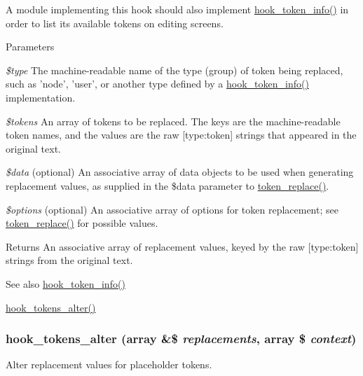A module implementing this hook should also implement \hyperlink{group__hooks_gab868597197cf36911f95dcd29ae0b954}{hook\_\-token\_\-info()} in order to list its available tokens on editing screens.


\begin{DoxyParams}{Parameters}
\item[{\em \$type}]The machine-\/readable name of the type (group) of token being replaced, such as 'node', 'user', or another type defined by a \hyperlink{group__hooks_gab868597197cf36911f95dcd29ae0b954}{hook\_\-token\_\-info()} implementation. \item[{\em \$tokens}]An array of tokens to be replaced. The keys are the machine-\/readable token names, and the values are the raw \mbox{[}type:token\mbox{]} strings that appeared in the original text. \item[{\em \$data}](optional) An associative array of data objects to be used when generating replacement values, as supplied in the \$data parameter to \hyperlink{includes_2token_8inc_a47eb294b05ca8d04439a9a82ccc4d82a}{token\_\-replace()}. \item[{\em \$options}](optional) An associative array of options for token replacement; see \hyperlink{includes_2token_8inc_a47eb294b05ca8d04439a9a82ccc4d82a}{token\_\-replace()} for possible values.\end{DoxyParams}
\begin{DoxyReturn}{Returns}
An associative array of replacement values, keyed by the raw \mbox{[}type:token\mbox{]} strings from the original text.
\end{DoxyReturn}
\begin{DoxySeeAlso}{See also}
\hyperlink{group__hooks_gab868597197cf36911f95dcd29ae0b954}{hook\_\-token\_\-info()} 

\hyperlink{group__hooks_gaeeea438e74b29e5603f0ed3f1967a257}{hook\_\-tokens\_\-alter()} 
\end{DoxySeeAlso}
\hypertarget{group__hooks_gaeeea438e74b29e5603f0ed3f1967a257}{
\subsubsection[{hook\_\-tokens\_\-alter}]{\setlength{\rightskip}{0pt plus 5cm}hook\_\-tokens\_\-alter (array \&\$ {\em replacements}, \/  array \$ {\em context})}}
\label{group__hooks_gaeeea438e74b29e5603f0ed3f1967a257}
Alter replacement values for placeholder tokens.



